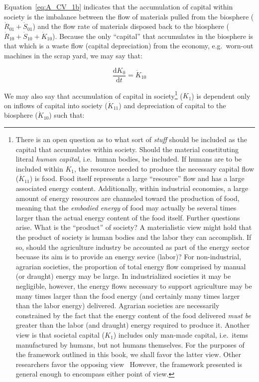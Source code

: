 Equation~\ref{eq:A_CV_1b} indicates that the accumulation 
of capital
within society is the imbalance 
between the flow of materials pulled from the biosphere
($\dot{R}_{01} + \dot{S}_{01}$) and the 
flow rate of materials disposed back to the biosphere 
($\dot{R}_{10} + \dot{S}_{10} + \dot{K}_{10}$). 
Because the only ``capital'' that accumulates in the biosphere
is that which is a waste flow (capital depreciation)
from the economy, e.g.\ worn-out machines in the scrap yard, we may say that:

\begin{equation} \label{eq:A_K0_balance}
	\frac{\mathrm{d}K_{0}}{\mathrm{d}t}		
	= \dot{K}_{10}
\end{equation}

We may also say that accumulation of capital in society\footnote{There is an open
question as to what sort of \emph{stuff} should be included as the capital
that accumulates within society. 
Should the material constituting literal
\emph{human capital}, i.e.~human bodies, be included. 
If humans are to be
included within $K_{1}$, the resource needed to produce the necessary capital
flow ($\dot{K}_{11}$) is food. 
Food itself represents a large ``resource''
flow and has a large associated energy content. 
Additionally, within industrial
economies, a large amount of 
energy resources are channeled toward the production of food, meaning that
the \emph{embodied energy} of food may actually be several times larger than
the actual energy content of the food itself. 
Further questions arise. 
What is the ``product'' of society? 
A materialistic view might hold that the product of
society is human bodies and the labor they can accomplish. 
If so, should
the agriculture industry be accounted as part of the energy sector becuase its 
aim is to provide an energy sevice (labor)? 
For non-industrial, agrarian societies, 
the proportion of total energy flow comprised by manual (or draught) energy may be
large. 
In industrialized societies it may be negligible, however, the energy flows
necessary to support agriculture may be many times larger than the food energy (and
certainly many times larger than the labor energy) delivered. 
Agrarian societies
are necessarily constrained by the fact that the energy content of the food delivered 
\emph{must be} greater than the labor (and draught) energy required to produce it.
Another view is that societal capital ($K_{1}$) includes only man-made capital, 
i.e.\ items manufactured by humans,
but not humans themselves. 
For the purposes of the framework outlined in this book, 
we shall favor the latter view.
Other researchers favor the opposing view~\cite{Giampietro2013}
However,
the framework presented is general enough to encompass either point of view.
} 
($K_{1}$) is dependent only on inflows of capital into society ($\dot{K}_{11}$) 
and depreciation of capital to the biosphere ($\dot{K}_{10}$) such that:

